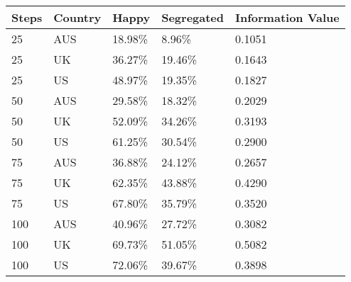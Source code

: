 \begin{table}[ht]
\centering
\begin{tabular}{lllll}
  \hline
Steps & Country & Happy & Segregated & Information Value \\ 
  \hline
25 & AUS & 18.98\% & 8.96\% & 0.1051 \\ 
  25 & UK & 36.27\% & 19.46\% & 0.1643 \\ 
  25 & US & 48.97\% & 19.35\% & 0.1827 \\ 
  50 & AUS & 29.58\% & 18.32\% & 0.2029 \\ 
  50 & UK & 52.09\% & 34.26\% & 0.3193 \\ 
  50 & US & 61.25\% & 30.54\% & 0.2900 \\ 
  75 & AUS & 36.88\% & 24.12\% & 0.2657 \\ 
  75 & UK & 62.35\% & 43.88\% & 0.4290 \\ 
  75 & US & 67.80\% & 35.79\% & 0.3520 \\ 
  100 & AUS & 40.96\% & 27.72\% & 0.3082 \\ 
  100 & UK & 69.73\% & 51.05\% & 0.5082 \\ 
  100 & US & 72.06\% & 39.67\% & 0.3898 \\ 
   \hline
\end{tabular}
\end{table}
